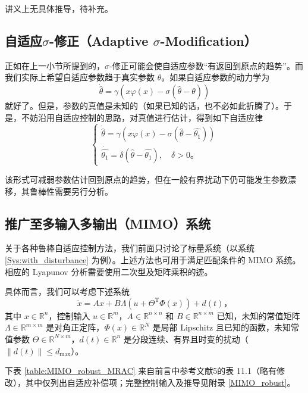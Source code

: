 讲义上无具体推导，待补充。

\subsection{\texorpdfstring{自适应$\sigma$-修正（Adaptive $\sigma$-Modification）}{自适应σ-修正（Adaptive σ-Modification）}}

正如在上一小节所提到的，$\sigma$-修正可能会使自适应参数“有返回到原点的趋势”。而我们实际上希望自适应参数趋于真实参数 $\theta$。如果自适应参数的动力学为
\[
    \dot{\hat{\theta}} = \gamma \left( x\varphi(x) - \sigma \left(\hat{\theta} - \theta \right) \right)
\]
就好了。但是，参数的真值是未知的（如果已知的话，也不必如此折腾了）。于是，不妨沿用自适应控制的思路，对真值进行估计，得到如下自适应律
\[
\begin{cases}
    \dot{\hat{\theta}} = \gamma \left( x\varphi(x) - \sigma \left(\hat{\theta} - \hat{\theta_1} \right) \right) \\
    \dot{\hat{\theta_1}} = \delta \left( \hat{\theta} - \hat{\theta_1} \right), \quad \delta > 0 \text{。}
\end{cases}
\]

该形式可减弱参数估计回到原点的趋势，但在一般有界扰动下仍可能发生参数漂移，其鲁棒性需要另行分析。

\subsection{推广至多输入多输出（MIMO）系统}

关于各种鲁棒自适应控制方法，我们前面只讨论了标量系统（以系统 \eqref{Sys:with_disturbance} 为例）。上述方法也可用于满足匹配条件的 MIMO 系统。相应的 Lyapunov 分析需要使用二次型及矩阵乘积的迹。

具体而言，我们可以考虑下述系统
\begin{equation}
    \dot{x} = A x + B \Lambda \left( u + \Theta^\mathrm{T} \Phi(x) \right) + d(t) \text{，}
\end{equation}
其中 $x \in \mathbb{R}^n$，控制输入 $u \in \mathbb{R}^m$，$A \in \mathbb{R}^{n \times n}$ 和 $B \in \mathbb{R}^{n \times m}$ 已知，未知的常值矩阵 $\Lambda \in \mathbb{R}^{m \times m}$ 是对角正定阵，$\Phi(x) \in \mathbb{R}^N$ 是局部 Lipschitz 且已知的函数，未知常值参数 $\Theta \in \mathbb{R}^{N \times m}$，$d(t) \in \mathbb{R}^n$ 是分段连续、有界且时变的扰动（$\| d(t) \| \leq d_{\mathrm{max}}$）。

下表 \ref{table:MIMO_robust_MRAC} 来自前言中参考文献5的表 11.1（略有修改），其中仅列出自适应补偿项；完整控制输入及推导见附录 \ref{MIMO_robust}。

